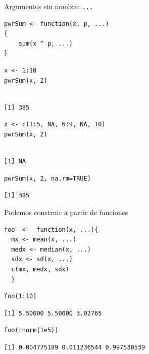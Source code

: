 \documentclass[aspectratio=169, usenames,svgnames,dvipsnames]{beamer}
\begin{document}
\begin{frame}[label={sec:org10d40a9},fragile]{Argumentos sin nombre: \texttt{...}}
 \lstset{language=r,label= ,caption= ,captionpos=b,numbers=none}
\begin{lstlisting}
pwrSum <- function(x, p, ...)
{
    sum(x ^ p, ...)
}
\end{lstlisting}

\lstset{language=r,label= ,caption= ,captionpos=b,numbers=none}
\begin{lstlisting}
x <- 1:10
pwrSum(x, 2)
\end{lstlisting}

\begin{verbatim}

[1] 385
\end{verbatim}


\lstset{language=r,label= ,caption= ,captionpos=b,numbers=none}
\begin{lstlisting}
x <- c(1:5, NA, 6:9, NA, 10)
pwrSum(x, 2)
\end{lstlisting}

\begin{verbatim}

[1] NA
\end{verbatim}


\lstset{language=r,label= ,caption= ,captionpos=b,numbers=none}
\begin{lstlisting}
pwrSum(x, 2, na.rm=TRUE)
\end{lstlisting}

\begin{verbatim}
[1] 385
\end{verbatim}
\end{frame}

\begin{frame}[label={sec:org8aa8ef7},fragile]{Podemos construir a partir de funciones}
 \lstset{language=r,label= ,caption= ,captionpos=b,numbers=none}
\begin{lstlisting}
foo  <-  function(x, ...){
  mx <- mean(x, ...)
  medx <- median(x, ...)
  sdx <- sd(x, ...)
  c(mx, medx, sdx)
  }
\end{lstlisting}

\lstset{language=r,label= ,caption= ,captionpos=b,numbers=none}
\begin{lstlisting}
foo(1:10)
\end{lstlisting}

\begin{verbatim}
[1] 5.50000 5.50000 3.02765
\end{verbatim}


\lstset{language=r,label= ,caption= ,captionpos=b,numbers=none}
\begin{lstlisting}
foo(rnorm(1e5))
\end{lstlisting}

\begin{verbatim}
[1] 0.004775189 0.011236544 0.997530539
\end{verbatim}
\end{frame}
\end{document}
